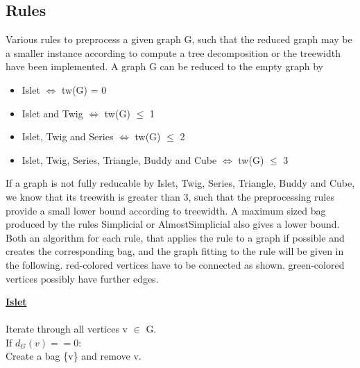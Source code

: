 \documentclass[a4wide]{article}
\begin{document}
\subsection{Rules}

Various rules to preprocess a given graph G, such that the reduced graph may be a smaller instance according to compute a tree decomposition or the treewidth have been implemented. A graph G can be reduced to the empty graph by
\begin{itemize}
\item Islet $\Leftrightarrow$ tw(G) = 0
\item Islet and Twig $\Leftrightarrow$ tw(G) $\leq$ 1
\item Islet, Twig and Series $\Leftrightarrow$ tw(G) $\leq$ 2
\item Islet, Twig, Series, Triangle, Buddy and Cube $\Leftrightarrow$ tw(G) $\leq$ 3
\end{itemize}

\vspace{2mm}

If a graph is not fully reducable by Islet, Twig, Series, Triangle, Buddy and Cube, we know that its treewith is greater than 3, such that the preprocessing rules provide a small lower bound according to treewidth. A maximum sized bag produced by the rules Simplicial or AlmostSimplicial also gives a lower bound. \\

Both an algorithm for each rule, that applies the rule to a graph if possible and creates the corresponding bag, and the graph fitting to the rule will be given in the following.
red-colored vertices have to be connected as shown. green-colored vertices possibly have further edges.\\

\begin{minipage}{0.5\textwidth}
\underline{\textbf{Islet}} \cite{B_tc3, E_B_safe} \\ \\
Iterate through all vertices v $\in$ G. \\
If $d_{G}(v) == 0$:  \\
Create a bag \{v\} and remove v. \\
\end{minipage}
\hspace{3.0cm}
\begin{minipage}{0.5\textwidth}
 \\
\end{minipage}
\end{document}
